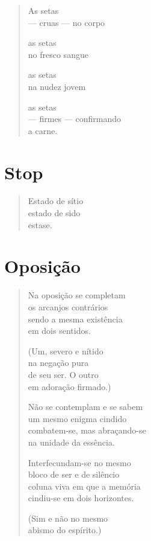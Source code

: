 \begin{verse}
As setas\\
--- cruas --- no corpo

as setas\\
no fresco sangue

as setas\\
na nudez jovem

as setas\\
--- firmes --- confirmando\\
\hfill a carne.
\end{verse}


\chapter{Stop}

\begin{verse}
Estado de sítio\\
estado de sido\\
estase.
\end{verse}

\chapter{Oposição}

\begin{verse}
Na oposição se completam\\
os arcanjos contrários\\
sendo a mesma existência\\
em dois sentidos.

(Um, severo e nítido\\
na negação pura\\
de seu ser. O outro\\
em adoração firmado.)

Não se contemplam e se sabem\\
um mesmo enigma cindido\\
combatem-se, mas abraçando-se\\
na unidade da essência.

Interfecundam-se no mesmo\\
bloco de ser e de silêncio\\
coluna viva em que a memória\\
cindiu-se em dois horizontes.

(Sim e não no mesmo\\
abismo do espírito.)
\end{verse}

